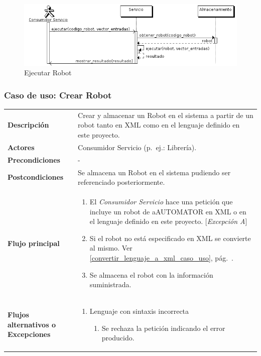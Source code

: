 \begin{figure}[bp!]
  \includegraphics[width=1\textwidth]{chapters/technical-manual/diagrams/sequence/ejecutar_robot.png}
\caption{Ejecutar Robot}
\end{figure}
\clearpage

\subsubsection{\large{Caso de uso: Crear Robot}}

\begin{tabular}[h]{ p{ } p{ }}

\textbf{Descripción} & Crear y almacenar un Robot en el sistema a
partir de un robot tanto en XML como en el lenguaje definido en este
proyecto. \\[3mm]

\textbf{Actores} & Consumidor Servicio (p.~ej.: Librería).\\[3mm]

\textbf{Precondiciones} & - \\[3mm]

\textbf{Postcondiciones} & Se almacena un Robot en el sistema pudiendo
ser referenciado posteriormente. \\[3mm]

\textbf{Flujo principal} & \begin{enumerate}[leftmargin=1em,topsep=0pt, partopsep=0pt]
  \item El \emph{Consumidor Servicio} hace una petición que incluye un robot
    de aAUTOMATOR en XML o en el lenguaje definido en este
    proyecto. [\emph{Excepción A}]
  \item Si el robot no está especificado en XML se convierte al
    mismo. Ver \ref{convertir_lenguaje_a_xml_caso_uso},
    pág.~\pageref{convertir_lenguaje_a_xml_caso_uso}.
  \item Se almacena el robot con la información suministrada.
\end{enumerate}\\[3mm]

\textbf{Flujos alternativos o Excepciones} &
\begin{enumerate}[label=\Alph*:,leftmargin=1em,topsep=0pt, partopsep=0pt]
\item Lenguaje con sintaxis incorrecta
  \begin{enumerate}[label=\arabic*.,topsep=0pt, partopsep=0pt]
    \item Se rechaza la petición indicando el error producido.
  \end{enumerate}
\end{enumerate}\\[3mm]
\end{tabular}

